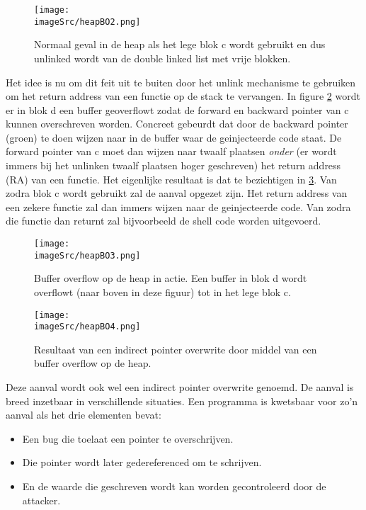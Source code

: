 \documentclass[../main.tex]{subfiles}
\begin{document}
\begin{figure}
\centering
\texttt{[image: \\imageSrc/heapBO2.png]}
\caption{Normaal geval in de heap als het lege blok c wordt gebruikt en dus unlinked wordt van de double linked list met vrije blokken.}
\label{f:heapBO2}
\end{figure}

Het idee is nu om dit feit uit te buiten door het unlink mechanisme te gebruiken om het return address van een functie op de stack te vervangen.
In figure \ref{f:heapBO3} wordt er in blok d een buffer geoverflowt zodat de forward en backward pointer van c kunnen overschreven worden.
Concreet gebeurdt dat door de backward pointer (groen) te doen wijzen naar in de buffer waar de geinjecteerde code staat. 
De forward pointer van c moet dan wijzen naar twaalf plaatsen \emph{onder} (er wordt immers bij het unlinken twaalf plaatsen hoger geschreven) het return address (RA) van een functie.
Het eigenlijke resultaat is dat te bezichtigen in \ref{f:heapBO4}.
Van zodra blok c wordt gebruikt zal de aanval opgezet zijn.
Het return address van een zekere functie zal dan immers wijzen naar de geinjecteerde code. 
Van zodra die functie dan returnt zal bijvoorbeeld de shell code worden uitgevoerd.

\begin{figure}
\centering
\texttt{[image: \\imageSrc/heapBO3.png]}
\caption{Buffer overflow op de heap in actie. Een buffer in blok d wordt overflowt (naar boven in deze figuur) tot in het lege blok c.}
\label{f:heapBO3}
\end{figure}

\begin{figure}
\centering
\texttt{[image: \\imageSrc/heapBO4.png]}
\caption{Resultaat van een indirect pointer overwrite door middel van een buffer overflow op de heap.}
\label{f:heapBO4}
\end{figure}

Deze aanval wordt ook wel een indirect pointer overwrite genoemd.
De aanval is breed inzetbaar in verschillende situaties.
Een programma is kwetsbaar voor zo'n aanval als het drie elementen bevat:
\begin{itemize}
		\item Een bug die toelaat een pointer te overschrijven.
		\item Die pointer wordt later gedereferenced om te schrijven.
		\item En de waarde die geschreven wordt kan worden gecontroleerd door de attacker.
\end{itemize}
\end{document}
